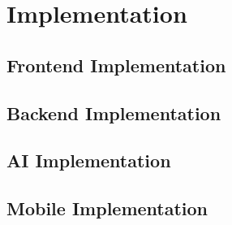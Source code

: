 \chapter{Implementation}

\section{Frontend Implementation}








\section{Backend Implementation}







% 
% 
% 

\section{AI Implementation}


\section{Mobile Implementation}





